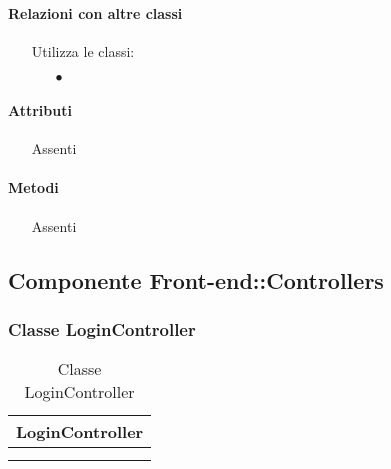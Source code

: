 \paragraph*{Relazioni con altre classi}
\begin{itemize}


\item[] Utilizza le classi:
\begin{itemize}
\item[$\bullet$] 
\end{itemize}
\end{itemize}

\paragraph*{Attributi}
\begin{itemize}
\item[] Assenti
\end{itemize}

\paragraph*{Metodi}
\begin{itemize}
\item[] Assenti
\end{itemize}

\subsection{Componente Front-end::Controllers}

\subsubsection{Classe LoginController}

\begin{table}[ht]
\begin{center}
\bgroup
\setlength{\arrayrulewidth}{0.6mm}
\def\arraystretch{1}
\begin{tabular}{ | p{12cm} | }
\hline
\centerline{\textbf{LoginController}}
\\ \hline
 \\ 
\hline
 \\ 
\hline
\end{tabular}
\egroup
\caption{Classe LoginController}
\end{center}
\end{table}

